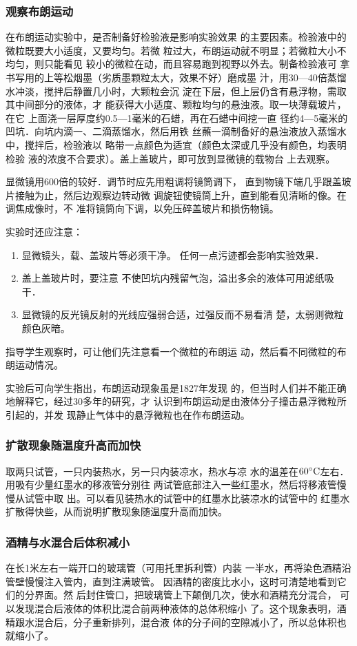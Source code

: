 \subsubsection{观察布朗运动}
在布朗运动实验中，是否制备好检验液是影响实验效果
的主要因素。检验液中的微粒既要大小适度，又要均匀。若微
粒过大，布朗运动就不明显；若微粒大小不均匀，则只能看见
较小的微粒在动，而且容易跑到视野以外去。制备检验液可
拿书写用的上等松烟墨（劣质墨颗粒太大，效果不好）磨成墨
汁，用30—40倍蒸馏水冲淡，搅拌后静置几小时，大颗粒会沉
淀在下层，但上层仍含有悬浮物，需取其中间部分的液体，才
能获得大小适度、颗粒均匀的悬浊液。取一块薄载玻片，在它
上面浇一层厚度约0.5—1毫米的石蜡，再在石蜡中间挖一直
径约4—5毫米的凹坑．向坑内滴一、二滴蒸馏水，然后用铁
丝蘸一滴制备好的悬浊液放入蒸馏水中，搅拌后，检验液以
略带一点颜色为适宜（颜色太深或几乎没有颜色，均表明检验
液的浓度不合要求）。盖上盖玻片，即可放到显微镜的载物台
上去观察。

显微镜用600倍的较好．调节时应先用粗调将镜筒调下，
直到物镜下端几乎跟盖玻片接触为止，然后边观察边转动微
调旋钮使镜筒上升，直到能看见清晰的像。在调焦成像时，不
准将镜筒向下调，以免压碎盖玻片和损伤物镜。

实验时还应注意：
\begin{enumerate}
\item 显微镜头，载、盖玻片等必须干净。
任何一点污迹都会影响实验效果．
\item 盖上盖玻片时，要注意
不使凹坑内残留气泡，溢出多余的液体可用滤纸吸干．
\item 
显微镜的反光镜反射的光线应强弱合适，过强反而不易看清
楚，太弱则微粒颜色灰暗。
\end{enumerate}

指导学生观察时，可让他们先注意看一个微粒的布朗运
动，然后看不同微粒的布朗运动情况。

实验后可向学生指出，布朗运动现象虽是1827年发现
的，但当时人们并不能正确地解释它，经过30多年的研究，才
认识到布朗运动是由液体分子撞击悬浮微粒所引起的，并发
现静止气体中的悬浮微粒也在作布朗运动。

\subsubsection{扩散现象随温度升高而加快}
取两只试管，一只内装热水，另一只内装凉水，热水与凉
水的温差在$60^{\circ}{\rm C}$左右．用吸有少量红墨水的移液管分别往
两试管底部注入一些红墨水，然后将移液管慢慢从试管中取
出。可以看见装热水的试管中的红墨水比装凉水的试管中的
红墨水扩散得快些，从而说明扩散现象随温度升高而加快。

\subsubsection{酒精与水混合后体积减小}
在长1米左右一端开口的玻璃管（可用托里拆利管）内装
一半水，再将染色酒精沿管壁慢慢注入管内，直到注满玻管。
因酒精的密度比水小，这时可清楚地看到它们的分界面。然
后封住管口，把玻璃管上下颠倒几次，使水和酒精充分混合，
可以发现混合后液体的体积比混合前两种液体的总体积缩小
了。这个现象表明，酒精跟水混合后，分子重新排列，混合液
体的分子间的空隙减小了，所以总体积也就缩小了。

